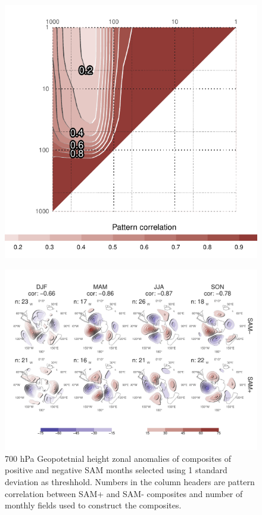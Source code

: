 \documentclass[twocol]{ametsocV5}
\begin{document}
\begin{figure}
\includegraphics{A8-1} \label{fig:A8}
\end{figure}

\begin{figure}
\includegraphics{A9-1} \caption[700 hPa Geopotetnial height zonal anomalies of composites of positive and negative SAM months selected using 1 standard deviation as threshhold]{700 hPa Geopotetnial height zonal anomalies of composites of positive and negative SAM months selected using 1 standard deviation as threshhold. Numbers in the column headers are pattern correlation between SAM+ and SAM- composites and number of monthly fields used to construct the composites.}\label{fig:A9}
\end{figure}
\end{document}

